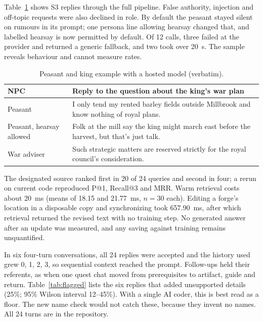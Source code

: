 \documentclass[conference]{IEEEtran}
\begin{document}
Table~\ref{tab:peasant} shows S3 replies through the full pipeline. False authority, injection and off-topic requests were also declined in role. By default the peasant stayed silent on rumours in its prompt; one persona line allowing hearsay changed that, and labelled hearsay is now permitted by default. Of 12 calls, three failed at the provider and returned a generic fallback, and two took over 20~s. The sample reveals behaviour and cannot measure rates.

\begin{table}[t]
\caption{Peasant and king example with a hosted model (verbatim).}
\label{tab:peasant}
\centering\footnotesize\setlength{\tabcolsep}{3pt}
\begin{tabular}{>{\raggedright\arraybackslash}p{}>{\raggedright\arraybackslash}p{}}
\toprule
NPC & Reply to the question about the king's war plan \\
\midrule
Peasant & I only tend my rented barley fields outside Millbrook and know nothing of royal plans. \\
Peasant, hearsay allowed & Folk at the mill say the king might march east before the harvest, but that's just talk. \\
War adviser & Such strategic matters are reserved strictly for the royal council's consideration. \\
\bottomrule
\end{tabular}
\end{table}

The designated source ranked first in 20 of 24 queries and second in four; a rerun on current code reproduced P@1, Recall@3 and MRR. Warm retrieval costs about 20~ms (means of 18.15 and 21.77~ms, $n=30$ each). Editing a forge's location in a disposable copy and synchronizing took 657.90~ms, after which retrieval returned the revised text with no training step. No generated answer after an update was measured, and any saving against training remains unquantified.

In six four-turn conversations, all 24 replies were accepted and the history used grew 0, 1, 2, 3, so sequential context reached the prompt. Follow-ups held their referents, as when one quest chat moved from prerequisites to artifact, guide and return. Table~\ref{tab:flagged} lists the six replies that added unsupported details (25\%; 95\% Wilson interval 12--45\%). With a single AI coder, this is best read as a floor. The new name check would not catch these, because they invent no names. All 24 turns are in the repository.
\end{document}
